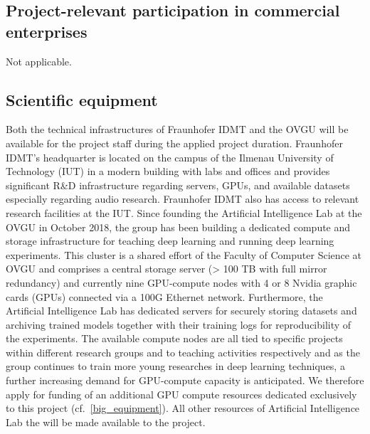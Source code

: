 \documentclass[11pt]{article}
\begin{document}
\subsection{Project-relevant participation in commercial enterprises}
Not applicable.
\vspace{-.3cm}

\subsection{Scientific equipment}
\label{existing_equipment}

Both the technical infrastructures of Fraunhofer IDMT and the OVGU will be available for the project staff during the applied project duration.
Fraunhofer IDMT's headquarter is located on the campus of the Ilmenau University of Technology (IUT) in a modern building with labs and offices and provides significant R\&D infrastructure regarding servers, GPUs, and available datasets especially regarding audio research. Fraunhofer IDMT also has access to relevant research facilities at the IUT.
Since founding the Artificial Intelligence Lab at the OVGU in October 2018, the group has been building a dedicated compute and storage infrastructure for teaching deep learning and running deep learning experiments.
This cluster is a shared effort of the Faculty of Computer Science at OVGU and comprises a central storage server (> 100 TB with full mirror redundancy) and currently nine GPU-compute nodes with 4 or 8 Nvidia graphic cards (GPUs) connected via a 100G Ethernet network.
Furthermore, the Artificial Intelligence Lab has dedicated servers for securely storing datasets and archiving trained models together with their training logs for reproducibility of the experiments.
The available compute nodes are all tied to specific projects within different research groups and to teaching activities respectively
and as the group continues to train more young researches in deep learning techniques, a further increasing demand for GPU-compute capacity is anticipated.
We therefore apply for funding of an additional GPU compute resources dedicated exclusively to this project (cf.~\ref{big_equipment}).
All other resources of Artificial Intelligence Lab the will be made available to the project.
\end{document}
